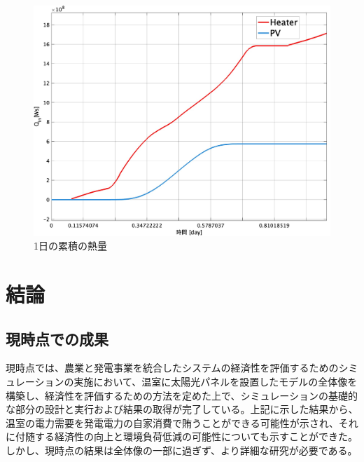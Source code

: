 \documentclass[uplatex,dvipdfmx,nomag,a4paper,oneside,onecolumn,12pt]{bxjsreport} %
\begin{document}
\begin{figure}[ht]
    \centering
    \includegraphics[width=0.8\linewidth]{fig/Qintotal.jpg}
    \caption{1日の累積の熱量}
    \label{fig:QinTotal}
\end{figure}


\chapter{結論}
\section{現時点での成果}
現時点では、農業と発電事業を統合したシステムの経済性を評価するためのシミュレーションの実施において、温室に太陽光パネルを設置したモデルの全体像を構築し、経済性を評価するための方法を定めた上で、シミュレーションの基礎的な部分の設計と実行および結果の取得が完了している。上記に示した結果から、温室の電力需要を発電電力の自家消費で賄うことができる可能性が示され、それに付随する経済性の向上と環境負荷低減の可能性についても示すことができた。しかし、現時点の結果は全体像の一部に過ぎず、より詳細な研究が必要である。
\end{document}
